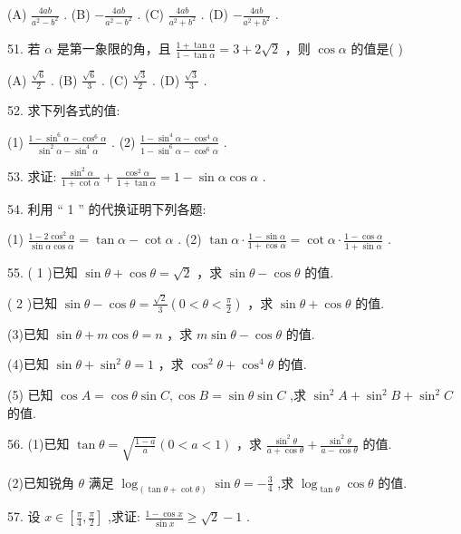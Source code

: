 \documentclass[10pt]{article}
\begin{document}
(A) \(\frac{4ab}{{a}^{2} - {b}^{2}}\) . (B) \(- \frac{4ab}{{a}^{2} - {b}^{2}}\) . (C) \(\frac{4ab}{{a}^{2} + {b}^{2}}\) . (D) \(- \frac{4ab}{{a}^{2} + {b}^{2}}\) .

51. 若 \(\alpha\) 是第一象限的角，且 \(\frac{1 + \tan \alpha }{1 - \tan \alpha } = 3 + 2\sqrt{2}\) ，则 \(\cos \alpha\) 的值是( )

(A) \(\frac{\sqrt{6}}{2}\) . (B) \(\frac{\sqrt{6}}{3}\) . (C) \(\frac{\sqrt{3}}{2}\) . (D) \(\frac{\sqrt{3}}{3}\) .

52. 求下列各式的值:

(1) \(\frac{1 - {\sin }^{6}\alpha  - {\cos }^{6}\alpha }{{\sin }^{2}\alpha  - {\sin }^{4}\alpha }\) . (2) \(\frac{1 - {\sin }^{4}\alpha  - {\cos }^{4}\alpha }{1 - {\sin }^{6}\alpha  - {\cos }^{6}\alpha }\) .

53. 求证: \(\frac{{\sin }^{2}\alpha }{1 + \cot \alpha } + \frac{{\cos }^{2}\alpha }{1 + \tan \alpha } = 1 - \sin \alpha \cos \alpha\) .

54. 利用 “ 1 ” 的代换证明下列各题:

(1) \(\frac{1 - 2{\cos }^{2}\alpha }{\sin \alpha \cos \alpha } = \tan \alpha  - \cot \alpha\) . (2) \(\tan \alpha  \cdot  \frac{1 - \sin \alpha }{1 + \cos \alpha } = \cot \alpha  \cdot  \frac{1 - \cos \alpha }{1 + \sin \alpha }\) .

55. ( 1 )已知 \(\sin \theta  + \cos \theta  = \sqrt{2}\) ，求 \(\sin \theta  - \cos \theta\) 的值.

( 2 )已知 \(\sin \theta  - \cos \theta  = \frac{\sqrt{2}}{3}\left( {0 < \theta  < \frac{\pi }{2}}\right)\) ，求 \(\sin \theta  + \cos \theta\) 的值.

(3)已知 \(\sin \theta  + m\cos \theta  = n\) ，求 \(m\sin \theta  - \cos \theta\) 的值.

(4)已知 \(\sin \theta  + {\sin }^{2}\theta  = 1\) ，求 \({\cos }^{2}\theta  + {\cos }^{4}\theta\) 的值.

(5) 已知 \(\cos A = \cos \theta \sin C,\cos B = \sin \theta \sin C\) ,求 \({\sin }^{2}A + {\sin }^{2}B + {\sin }^{2}C\) 的值.

56. (1)已知 \(\tan \theta  = \sqrt{\frac{1 - a}{a}}\left( {0 < a < 1}\right)\) ，求 \(\frac{{\sin }^{2}\theta }{a + \cos \theta } + \frac{{\sin }^{2}\theta }{a - \cos \theta }\) 的值.

(2)已知锐角 \(\theta\) 满足 \({\log }_{\left( \tan \theta  + \cot \theta \right) }\sin \theta  =  - \frac{3}{4}\) ,求 \({\log }_{\tan \theta }\cos \theta\) 的值.

57. 设 \(x \in  \left\lbrack  {\frac{\pi }{4},\frac{\pi }{2}}\right\rbrack\) ,求证: \(\frac{1 - \cos x}{\sin x} \geq  \sqrt{2} - 1\) .
\end{document}

